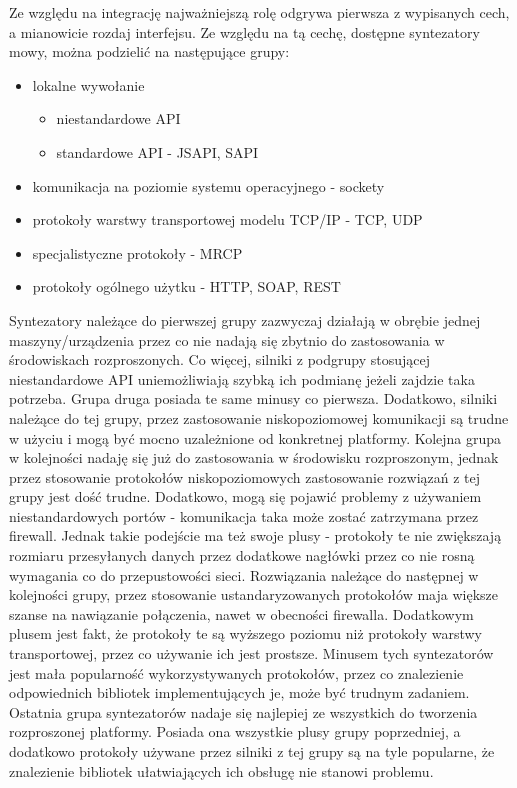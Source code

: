 Ze względu na integrację najważniejszą rolę odgrywa pierwsza z wypisanych cech, a mianowicie rozdaj interfejsu. Ze względu na tą cechę, dostępne syntezatory mowy, można podzielić na następujące grupy: 

\begin{itemize}
	\item lokalne wywołanie
		\begin{itemize}
			\item niestandardowe API
			\item standardowe API - JSAPI, SAPI
		\end{itemize}
	\item komunikacja na poziomie systemu operacyjnego - sockety
	\item protokoły warstwy transportowej modelu TCP/IP - TCP, UDP
	\item specjalistyczne protokoły - MRCP
	\item protokoły ogólnego użytku - HTTP, SOAP, REST
\end{itemize}


Syntezatory należące do pierwszej grupy zazwyczaj działają w obrębie jednej maszyny/urządzenia przez co nie nadają się zbytnio do zastosowania w środowiskach rozproszonych. Co więcej, silniki z podgrupy stosującej niestandardowe API uniemożliwiają szybką ich podmianę jeżeli zajdzie taka potrzeba. 
Grupa druga posiada te same minusy co pierwsza. Dodatkowo, silniki należące do tej grupy, przez zastosowanie niskopoziomowej komunikacji są trudne w użyciu i mogą być mocno uzależnione od konkretnej platformy.
Kolejna grupa w kolejności nadaję się już do zastosowania w środowisku rozproszonym, jednak przez stosowanie protokołów niskopoziomowych zastosowanie rozwiązań z tej grupy jest dość trudne. Dodatkowo, mogą się pojawić problemy z używaniem niestandardowych portów - komunikacja taka może zostać zatrzymana przez firewall. Jednak takie podejście ma też swoje plusy - protokoły te nie zwiększają rozmiaru przesyłanych danych przez dodatkowe nagłówki przez co nie rosną wymagania co do przepustowości sieci.
Rozwiązania należące do następnej w kolejności grupy, przez stosowanie ustandaryzowanych protokołów maja większe szanse na nawiązanie połączenia, nawet w obecności firewalla. Dodatkowym plusem jest fakt, że protokoły te są wyższego poziomu niż protokoły warstwy transportowej, przez co używanie ich jest prostsze. Minusem tych syntezatorów jest mała popularność wykorzystywanych protokołów, przez co znalezienie odpowiednich bibliotek implementujących je, może być trudnym zadaniem.
Ostatnia grupa syntezatorów nadaje się najlepiej ze wszystkich do tworzenia rozproszonej platformy. Posiada ona wszystkie plusy grupy poprzedniej, a dodatkowo protokoły używane przez silniki z tej grupy są na tyle popularne, że znalezienie bibliotek ułatwiających ich obsługę nie stanowi problemu. 

